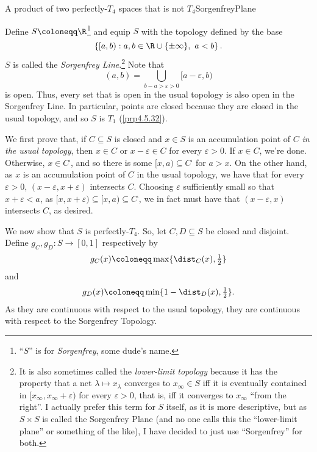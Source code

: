 \begin{exm}{A product of two perfectly-$T_4$ spaces that is not $T_4$}{SorgenfreyPlane}
\forwardref

\noindent
Define $S\coloneqq \R$\footnote{``$S$'' is for \emph{Sorgenfrey}, some dude's name.} and equip $S$ with the topology defined by the base
\begin{equation}
\left\{ [a,b):a,b\in \R \cup \{ \pm \infty\} ,\ a<b\right\} .
\end{equation}
$S$ is called the \emph{Sorgenfrey Line}.\footnote{It is also sometimes called the \emph{lower-limit topology} because it has the property that a net $\lambda \mapsto x_{\lambda}$ converges to $x_{\infty}\in S$ iff it is eventually contained in $[x_{\infty},x_{\infty}+\varepsilon )$ for every $\varepsilon >0$, that is, iff it converges to $x_{\infty}$ ``from the right''.  I actually prefer this term for $S$ itself, as it is more descriptive, but as $S\times S$ is called the Sorgenfrey Plane (and no one calls this the ``lower-limit plane'' or something of the like), I have decided to just use ``Sorgenfrey'' for both.}  Note that
\begin{equation}
(a,b)=\bigcup _{b-a>\varepsilon >0}[a-\varepsilon ,b)
\end{equation}
is open.  Thus, every set that is open in the usual topology is also open in the Sorgenfrey Line.  In particular, points are closed because they are closed in the usual topology, and so $S$ is $T_1$ (\cref{prp4.5.32}).

We first prove that, if $C\subseteq S$ is closed and $x\in S$ is an accumulation point of $C$ \emph{in the usual topology}, then $x\in C$ or $x-\varepsilon \in C$ for every $\varepsilon >0$.  If $x\in C$, we're done.  Otherwise, $x\in C^{\comp}$, and so there is some $[x,a)\subseteq C^{\comp}$ for $a>x$.  On the other hand, as $x$ is an accumulation point of $C$ in the usual topology, we have that for every $\varepsilon >0$, $(x-\varepsilon ,x+\varepsilon )$ intersects $C$.  Choosing $\varepsilon$ sufficiently small so that $x+\varepsilon <a$, as $[x,x+\varepsilon )\subseteq [x,a)\subseteq C^{\comp}$, we in fact must have that $(x-\varepsilon ,x)$ intersects $C$, as desired.

We now show that $S$ is perfectly-$T_4$.  So, let $C,D\subseteq S$ be closed and disjoint.  Define $g_C,g_D\colon S\rightarrow [0,1]$ respectively by
\begin{equation}
g_C(x)\coloneqq \max \{ \dist _C(x),\tfrac{1}{2}\}
\end{equation}
and
\begin{equation}
g_D(x)\coloneqq \min \{ 1-\dist _D(x),\tfrac{1}{2}\} .
\end{equation}
As they are continuous with respect to the usual topology, they are continuous with respect to the Sorgenfrey Topology.


\end{exm}
